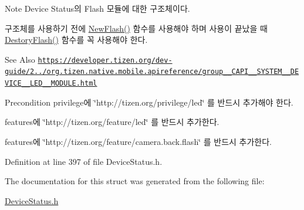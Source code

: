 \begin{DoxyNote}{Note}
Device Status의 Flash 모듈에 대한 구조체이다. \par
 구조체를 사용하기 전에 \hyperlink{DeviceStatus_8h_a503e0814548cc9f370f87a3359187bff}{New\-Flash()} 함수를 사용해야 하며 사용이 끝났을 때 \hyperlink{DeviceStatus_8h_a4d0567730f41384d32902ef2b7c4b242}{Destory\-Flash()} 함수를 꼭 사용해야 한다. 
\end{DoxyNote}
\begin{DoxySeeAlso}{See Also}
\href{https://developer.tizen.org/dev-guide/2.3.0/org.tizen.native.mobile.apireference/group__CAPI__SYSTEM__DEVICE__LED__MODULE.html}{\tt https\-://developer.\-tizen.\-org/dev-\/guide/2../org.\-tizen.\-native.\-mobile.\-apireference/group\-\_\-\-\_\-\-C\-A\-P\-I\-\_\-\-\_\-\-S\-Y\-S\-T\-E\-M\-\_\-\-\_\-\-D\-E\-V\-I\-C\-E\-\_\-\-\_\-\-L\-E\-D\-\_\-\-\_\-\-M\-O\-D\-U\-L\-E.\-html} 
\end{DoxySeeAlso}
\begin{DoxyPrecond}{Precondition}
privilege에 \char`\"{}http\-://tizen.\-org/privilege/led\char`\"{} 를 반드시 추가해야 한다. \par
 features에 \char`\"{}http\-://tizen.\-org/feature/led\char`\"{} 를 반드시 추가한다. \par
 features에 \char`\"{}http\-://tizen.\-org/feature/camera.\-back.\-flash\char`\"{} 를 반드시 추가한다. 
\end{DoxyPrecond}


Definition at line 397 of file Device\-Status.\-h.



The documentation for this struct was generated from the following file\-:\begin{DoxyCompactItemize}
\item 
\hyperlink{DeviceStatus_8h}{Device\-Status.\-h}\end{DoxyCompactItemize}

